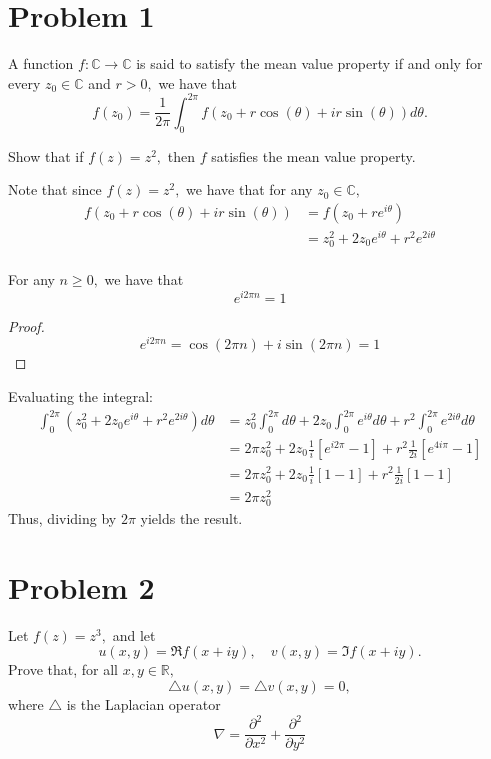 \documentclass[11pt]{article}
\newcommand{\bbC}{\mathbb{C}}
\newcommand{\bbR}{\mathbb{R}}
\begin{document}
	
	
	\psetheader

\section*{Problem 1}
\begin{problem}
    A function $f: \bbC \to \bbC$ is said to satisfy the mean value property if and only for every $z_0 \in \bbC$ and $r>0,$ we have that 
    \[f(z_0) = \frac{1}{2\pi}\int_0^{2\pi}f(z_0 + r\cos(\theta) + i r \sin(\theta))d\theta.\]

    Show that if $f(z) = z^2,$ then $f$ satisfies the mean value property.
\end{problem}
\begin{solution}
    Note that since $f(z) = z^2,$ we have that for any $z_0 \in \bbC,$
    \begin{align*}
    f(z_0 + r\cos(\theta) + i r\sin(\theta)) &= f(z_0 + re^{i \theta})\\ &= z_0^2 + 2z_0e^{i\theta}+ r^2e^{2i\theta}\\
    \end{align*}
    \begin{lemma}
        For any $n \geq 0,$ we have that \[e^{i2\pi n} = 1\]
    \end{lemma}
    \begin{proof}
        \[e^{i2\pi n} = \cos(2\pi n) + i \sin(2\pi n) = 1\]
    \end{proof}
    Evaluating the integral:
    \begin{align*}
        \int_0^{2\pi}(z_0^2 + 2z_0e^{i\theta}+ r^2e^{2i\theta}) d\theta &= z_0^2\int_0^{2\pi}d\theta + 2z_0\int_0^{2\pi}e^{i\theta}d\theta+ r^2\int_0^{2\pi}e^{2i\theta} d\theta\\
        &= 2\pi z_0^2 + 2z_0 \frac{1}{i}[e^{i2\pi} - 1] + r^2 \frac{1}{2i}[e^{4i\pi} - 1]\\
        &= 2\pi z_0^2 + 2z_0 \frac{1}{i}[1 - 1] + r^2 \frac{1}{2i}[1 - 1]\\
        &= 2\pi z_0^2
    \end{align*}
    Thus, dividing by $2\pi$ yields the result.
\end{solution}

\newpage
\section*{Problem 2}
\begin{problem}
    Let $f(z) = z^3,$ and let 
    \[u(x,y) = \Re{f(x + iy)}, \quad v(x,y) = \Im{f(x + iy)}.\] Prove that, for all $x,y \in \bbR,$ 
    \[\triangle u(x,y) = \triangle v(x,y) = 0,\] where $\triangle$ is the Laplacian operator
    \[\nabla = \frac{\partial^2}{\partial x^2} + \frac{\partial^2}{\partial y^2}\]
\end{problem}
\end{document}
